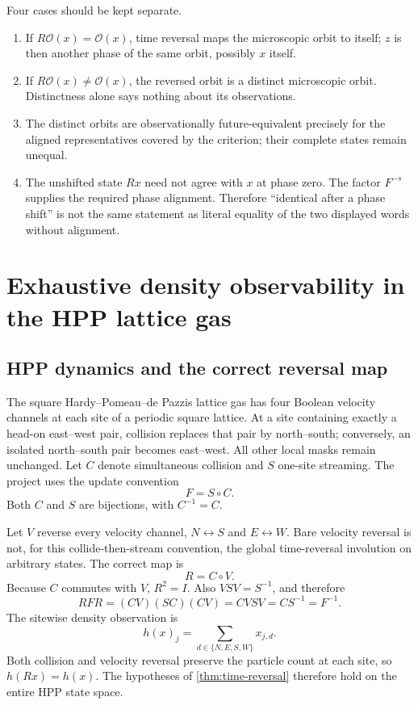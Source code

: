 \documentclass[11pt]{article}
\begin{document}
Four cases should be kept separate.
\begin{enumerate}[leftmargin=1.55em]
  \item If $R\mathcal O(x)=\mathcal O(x)$, time reversal maps the microscopic
  orbit to itself; $z$ is then another phase of the same orbit, possibly $x$
  itself.
  \item If $R\mathcal O(x)\neq\mathcal O(x)$, the reversed orbit is a distinct
  microscopic orbit. Distinctness alone says nothing about its observations.
  \item The distinct orbits are observationally future-equivalent precisely for
  the aligned representatives covered by the criterion; their complete states
  remain unequal.
  \item The unshifted state $Rx$ need not agree with $x$ at phase zero. The
  factor $F^{-s}$ supplies the required phase alignment. Therefore ``identical
  after a phase shift'' is not the same statement as literal equality of the two
  displayed words without alignment.
\end{enumerate}

\section{Exhaustive density observability in the HPP lattice gas}

\subsection{HPP dynamics and the correct reversal map}

The square Hardy--Pomeau--de Pazzis lattice gas \cite{hardy1973} has four Boolean
velocity channels at each site of a periodic square lattice. At a site containing
exactly a head-on east--west pair, collision replaces that pair by north--south;
conversely, an isolated north--south pair becomes east--west. All other local
masks remain unchanged. Let $C$ denote simultaneous collision and $S$ one-site
streaming. The project uses the update convention
\[
F=S\circ C.
\]
Both $C$ and $S$ are bijections, with $C^{-1}=C$.

Let $V$ reverse every velocity channel, $N\leftrightarrow S$ and
$E\leftrightarrow W$. Bare velocity reversal is not, for this collide-then-stream
convention, the global time-reversal involution on arbitrary states. The correct
map is
\[
R=C\circ V.
\]
Because $C$ commutes with $V$, $R^2=I$. Also $VSV=S^{-1}$, and therefore
\[
RFR=(CV)(SC)(CV)=CVSV=C S^{-1}=F^{-1}.
\]
The sitewise density observation is
\[
h(x)_j=\sum_{d\in\{N,E,S,W\}}x_{j,d}.
\]
Both collision and velocity reversal preserve the particle count at each site, so
$h(Rx)=h(x)$. The hypotheses of \cref{thm:time-reversal} therefore hold on the
entire HPP state space.
\end{document}
